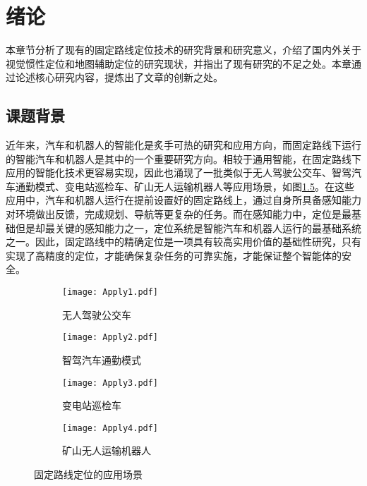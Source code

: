 
\chapter{绪论}

本章节分析了现有的固定路线定位技术的研究背景和研究意义，介绍了国内外关于视觉惯性定位和地图辅助定位的研究现状，并指出了现有研究的不足之处。本章通过论述核心研究内容，提炼出了文章的创新之处。


\section{课题背景}
近年来，汽车和机器人的智能化是炙手可热的研究和应用方向，而固定路线下运行的智能汽车和机器人是其中的一个重要研究方向。相较于通用智能，在固定路线下应用的智能化技术更容易实现，因此也涌现了一批类似于无人驾驶公交车\cite{stephen2023driverless}、智驾汽车通勤模式\cite{xin2023xinchuxing}、变电站巡检车\cite{song2020xinhuawang}、矿山无人运输机器人\cite{li2023keji}等应用场景，如图\ref{fig:apply}。在这些应用中，汽车和机器人运行在提前设置好的固定路线上，通过自身所具备感知能力对环境做出反馈，完成规划、导航等更复杂的任务。而在感知能力中，定位是最基础但是却最关键的感知能力之一，定位系统是智能汽车和机器人运行的最基础系统之一。因此，固定路线中的精确定位是一项具有较高实用价值的基础性研究，只有实现了高精度的定位，才能确保复杂任务的可靠实施，才能保证整个智能体的安全。
\begin{figure}[htbp]
  \centering
  \begin{subfigure}[b]{0.45\textwidth}
      \centering
      \texttt{[image: Apply1.pdf]}
      \caption{无人驾驶公交车\cite{stephen2023driverless}}
      \label{fig:apply_sub1}
  \end{subfigure}
  \begin{subfigure}[b]{0.45\textwidth}
      \centering
      \texttt{[image: Apply2.pdf]}
      \caption{智驾汽车通勤模式\cite{xin2023xinchuxing}}
      \label{fig:apply_sub2}
  \end{subfigure}
  \begin{subfigure}[b]{0.45\textwidth}
      \centering
      \texttt{[image: Apply3.pdf]}
      \caption{变电站巡检车\cite{song2020xinhuawang}}
      \label{fig:apply_sub3}
  \end{subfigure}
  \begin{subfigure}[b]{0.45\textwidth}
      \centering
      \texttt{[image: Apply4.pdf]}
      \caption{矿山无人运输机器人\cite{li2023keji}}
      \label{fig:apply_sub4}
  \end{subfigure}

  \caption{固定路线定位的应用场景}
  \label{fig:apply}
\end{figure}

